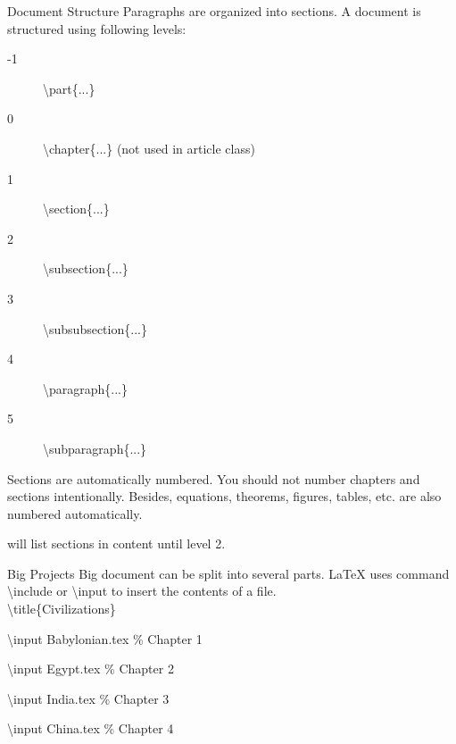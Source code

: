 \documentclass[10pt,t]{beamer}
\begin{document}
\begin{frame}{Document Structure}
Paragraphs are organized into sections.
A document is structured using following levels:
\begin{description}
    \item[-1] \textbackslash part\{...\}
    \item[0] \textbackslash chapter\{...\} (\alert{not used in article class})
    \item[1] \textbackslash section\{...\}
    \item[2] \textbackslash subsection\{...\}
    \item[3] \textbackslash subsubsection\{...\}
    \item[4] \textbackslash paragraph\{...\}
    \item[5] \textbackslash subparagraph\{...\}
\end{description}

Sections are automatically numbered. You should not number chapters
and sections intentionally. Besides, equations, theorems, figures,
tables, etc. are also numbered automatically.


    will list sections in content until level 2.
\end{frame}

\begin{frame}{Big Projects}
    Big document can be split into several parts. \LaTeX{} uses
    command \alert{\textbackslash include} or \alert{\textbackslash input}
    to insert the contents of a file.\\[3ex]

\textbackslash title\{Civilizations\}

\textbackslash input Babylonian.tex \qquad \% Chapter 1

\textbackslash input Egypt.tex \qquad\qquad \% Chapter 2

\textbackslash input India.tex \qquad\qquad \% Chapter 3

\textbackslash input China.tex \qquad\qquad \% Chapter 4


\end{frame}
\end{document}
